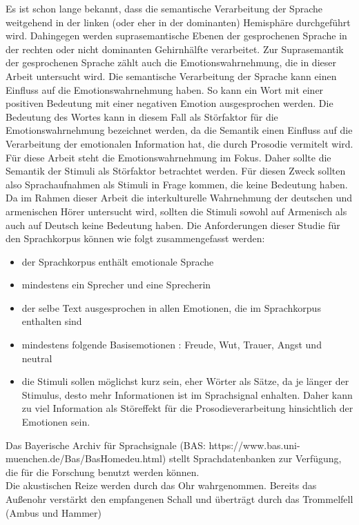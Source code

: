 \documentclass[11pt,a4paper,headsepline,twoside,toc=bibliography]{scrreprt}
\begin{document}
Es ist schon lange bekannt, dass die semantische Verarbeitung der Sprache weitgehend in der linken (oder eher in der dominanten) Hemisphäre durchgeführt wird. Dahingegen werden suprasemantische Ebenen der gesprochenen Sprache in der rechten oder nicht dominanten Gehirnhälfte verarbeitet. Zur Suprasemantik der gesprochenen Sprache zählt auch die Emotionswahrnehmung, die in dieser Arbeit untersucht wird. Die semantische Verarbeitung der Sprache kann einen Einfluss auf die Emotionswahrnehmung haben. So kann ein Wort mit einer positiven Bedeutung mit einer negativen Emotion ausgesprochen werden. Die Bedeutung des Wortes kann in diesem Fall als Störfaktor für die Emotionswahrnehmung bezeichnet werden, da die Semantik einen Einfluss auf die Verarbeitung der emotionalen Information hat, die durch Prosodie vermitelt wird. Für diese Arbeit steht die Emotionswahrnehmung im Fokus. Daher sollte die Semantik der Stimuli als Störfaktor betrachtet werden. Für diesen Zweck sollten also Sprachaufnahmen als Stimuli in Frage kommen, die keine Bedeutung haben. Da im Rahmen dieser Arbeit die interkulturelle Wahrnehmung der deutschen und armenischen Hörer untersucht wird, sollten die Stimuli sowohl auf Armenisch als auch auf Deutsch keine Bedeutung haben. Die Anforderungen dieser Studie für den Sprachkorpus können wie folgt zusammengefasst werden: 


\begin{itemize}
	\item der Sprachkorpus enthält emotionale Sprache
	\item mindestens ein Sprecher und eine Sprecherin
	\item der selbe Text ausgesprochen in allen Emotionen, die im Sprachkorpus enthalten sind
	\item mindestens folgende Basisemotionen : Freude, Wut, Trauer, Angst und neutral
	\item die Stimuli sollen möglichst kurz sein, eher Wörter als Sätze, da je länger der Stimulus, desto mehr  Informationen ist im Sprachsignal enhalten. Daher kann zu viel Information als Störeffekt für die Prosodieverarbeitung hinsichtlich der Emotionen sein.
\end{itemize}


Das Bayerische Archiv für Sprachsignale (BAS: https://www.bas.uni-muenchen.de/Bas/BasHomedeu.html) stellt Sprachdatenbanken zur Verfügung, die für die Forschung benutzt werden können. \\


Die akustischen Reize werden durch das Ohr wahrgenommen. Bereits das Außenohr verstärkt den empfangenen Schall und überträgt durch das Trommelfell (Ambus und Hammer) \\
\end{document}
